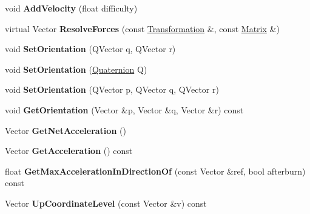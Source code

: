 \begin{DoxyCompactItemize}
\item 
void {\bfseries Add\+Velocity} (float difficulty)\hypertarget{classUnit_af51538046336a29cf470ba8b2ac246ac}{}\label{classUnit_af51538046336a29cf470ba8b2ac246ac}

\item 
virtual Vector {\bfseries Resolve\+Forces} (const \hyperlink{structTransformation}{Transformation} \&, const \hyperlink{classMatrix}{Matrix} \&)\hypertarget{classUnit_abed3d290ef42c76be193a441e4ccf7bd}{}\label{classUnit_abed3d290ef42c76be193a441e4ccf7bd}

\item 
void {\bfseries Set\+Orientation} (Q\+Vector q, Q\+Vector r)\hypertarget{classUnit_ae2196ab751ce3cf5bf7f20846f2e3d08}{}\label{classUnit_ae2196ab751ce3cf5bf7f20846f2e3d08}

\item 
void {\bfseries Set\+Orientation} (\hyperlink{structQuaternion}{Quaternion} Q)\hypertarget{classUnit_a09b6a966bbdbbe805e2c7feaeaf8a263}{}\label{classUnit_a09b6a966bbdbbe805e2c7feaeaf8a263}

\item 
void {\bfseries Set\+Orientation} (Q\+Vector p, Q\+Vector q, Q\+Vector r)\hypertarget{classUnit_a60c5f413eb81f4654a9afe12df4cb675}{}\label{classUnit_a60c5f413eb81f4654a9afe12df4cb675}

\item 
void {\bfseries Get\+Orientation} (Vector \&p, Vector \&q, Vector \&r) const \hypertarget{classUnit_a88e34c4db780b316f0dd4fa1102a76b8}{}\label{classUnit_a88e34c4db780b316f0dd4fa1102a76b8}

\item 
Vector {\bfseries Get\+Net\+Acceleration} ()\hypertarget{classUnit_abaabcaf4618c47854bcaf82bbcc8a412}{}\label{classUnit_abaabcaf4618c47854bcaf82bbcc8a412}

\item 
Vector {\bfseries Get\+Acceleration} () const \hypertarget{classUnit_a1fa1529b1570e6e7ab188f718fd3f546}{}\label{classUnit_a1fa1529b1570e6e7ab188f718fd3f546}

\item 
float {\bfseries Get\+Max\+Acceleration\+In\+Direction\+Of} (const Vector \&ref, bool afterburn) const \hypertarget{classUnit_a1d6634e153a583507e463b9a007c2228}{}\label{classUnit_a1d6634e153a583507e463b9a007c2228}

\item 
Vector {\bfseries Up\+Coordinate\+Level} (const Vector \&v) const \hypertarget{classUnit_a60a7cf9969b1841c4f8c81b696644b5a}{}\label{classUnit_a60a7cf9969b1841c4f8c81b696644b5a}


\end{DoxyCompactItemize}
